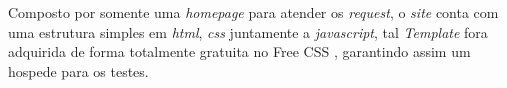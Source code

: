 \documentclass[12pt]{article}
\begin{document}
    Composto por somente uma \textit{homepage} para atender os \textit{request}, o \textit{site} conta com uma estrutura simples em \textit{html}, \textit{css} juntamente a \textit{javascript}, tal \textit{Template} fora adquirida de forma totalmente gratuita no Free CSS \cite{sitesFree}, garantindo assim um hospede para os testes.



    



\end{document}

